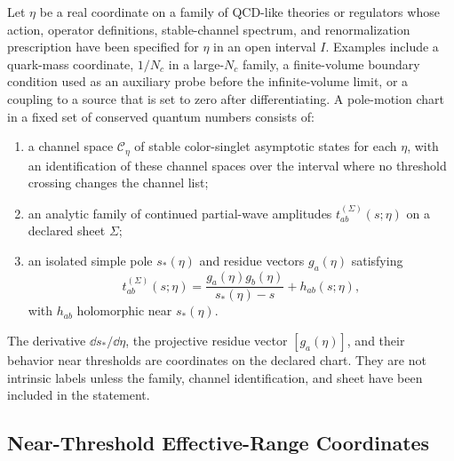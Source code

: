 \begin{definition}
\label{def:qcd-controlled-pole-motion-chart}
Let \(\eta\) be a real coordinate on a family of QCD-like theories or
regulators whose action, operator definitions, stable-channel spectrum, and
renormalization prescription have been specified for \(\eta\) in an open
interval \(I\).  Examples include a quark-mass coordinate, \(1/N_c\) in a
large-\(N_c\) family, a finite-volume boundary condition used as an auxiliary
probe before the infinite-volume limit, or a coupling to a source that is set
to zero after differentiating.  A pole-motion chart in a fixed set of
conserved quantum numbers consists of:
\begin{enumerate}
  \item a channel space \(\mathcal C_\eta\) of stable color-singlet
  asymptotic states for each \(\eta\), with an identification of these
  channel spaces over the interval where no threshold crossing changes the
  channel list;
  \item an analytic family of continued partial-wave amplitudes
  \(t^{(\Sigma)}_{ab}(s;\eta)\) on a declared sheet \(\Sigma\);
  \item an isolated simple pole \(s_\ast(\eta)\) and residue vectors
  \(g_a(\eta)\) satisfying
  \[
    t_{ab}^{(\Sigma)}(s;\eta)
    =
    \frac{g_a(\eta)g_b(\eta)}{s_\ast(\eta)-s}
    +h_{ab}(s;\eta),
  \]
  with \(h_{ab}\) holomorphic near \(s_\ast(\eta)\).
\end{enumerate}
The derivative \(\dd s_\ast/\dd\eta\), the projective residue vector
\([g_a(\eta)]\), and their behavior near thresholds are coordinates on the
declared chart.  They are not intrinsic labels unless the family, channel
identification, and sheet have been included in the statement.
\end{definition}

\subsection{Near-Threshold Effective-Range Coordinates}
\label{subsec:qcd-near-threshold-effective-range-coordinates}

